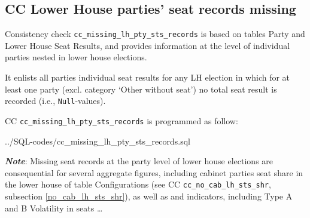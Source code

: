 \subsection{CC Lower House parties' seat records missing}\label{cc_missing_lh_pty_sts_records}
Consistency check \texttt{\footnotesize cc\_missing\_lh\_pty\_sts\_records} is based on tables Party and Lower House Seat Results, and provides information at the level of individual parties nested in lower house elections. 

It enlists all parties individual seat results for any LH election in which for at least one party (excl. category `Other without seat') no total seat result is recorded (i.e., \texttt{\footnotesize Null}-values).			

CC \texttt{\footnotesize cc\_missing\_lh\_pty\_sts\_records} is programmed as follow: 

%
{../SQL-codes/cc_missing_lh_pty_sts_records.sql}

{\em \bf Note}: Missing seat records at the party level of lower house elections are consequential for several aggregate figures, including cabinet parties seat share in the lower house of table Configurations (see CC \texttt{\footnotesize cc\_no\_cab\_lh\_sts\_shr}, subsection \ref{no_cab_lh_sts_shr}), as well as and indicators, including Type A and B Volatility in seats \ldots
